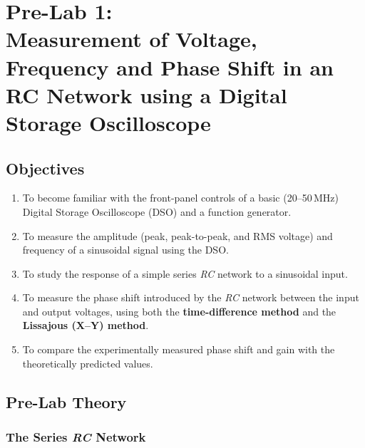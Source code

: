 %
\chapter*{Pre-Lab 1:\\Measurement of Voltage, Frequency and Phase Shift in an RC Network using a Digital Storage Oscilloscope}
\label{sec:prelab1}

\section*{Objectives}
\begin{enumerate}[label=(\roman*)]
	\item To become familiar with the front-panel controls of a basic (20--50\,MHz) Digital Storage Oscilloscope (DSO) and a function generator.
	\item To measure the amplitude (peak, peak-to-peak, and RMS voltage) and frequency of a sinusoidal signal using the DSO.
	\item To study the response of a simple series \emph{RC} network to a sinusoidal input.
	\item To measure the phase shift introduced by the \emph{RC} network between the input and output voltages, using both the \textbf{time-difference method} and the \textbf{Lissajous (X--Y) method}.
	\item To compare the experimentally measured phase shift and gain with the theoretically predicted values.
\end{enumerate}

\section*{Pre-Lab Theory}

\subsection*{The Series \emph{RC} Network}

